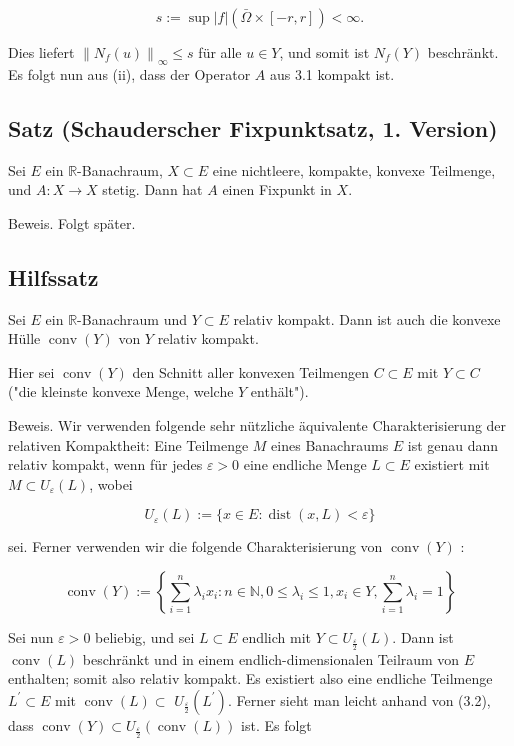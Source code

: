 \documentclass[10pt, letterpaper]{article}
\begin{document}
$$
s:=\sup |f|(\bar{\Omega} \times[-r, r])<\infty .
$$

Dies liefert $\left\|N_{f}(u)\right\|_{\infty} \leq s$ für alle $u \in Y$, und somit ist $N_{f}(Y)$ beschränkt. Es folgt nun aus (ii), dass der Operator $A$ aus 3.1 kompakt ist.

\subsection*{Satz (Schauderscher Fixpunktsatz, 1. Version)}

Sei $E$ ein $\mathbb{R}$-Banachraum, $X \subset E$ eine nichtleere, kompakte, konvexe Teilmenge, und $A: X \rightarrow X$ stetig. Dann hat $A$ einen Fixpunkt in $X$.

Beweis. Folgt später.

\subsection*{Hilfssatz}

Sei $E$ ein $\mathbb{R}$-Banachraum und $Y \subset E$ relativ kompakt. Dann ist auch die konvexe Hülle $\operatorname{conv}(Y)$ von $Y$ relativ kompakt.

Hier sei $\operatorname{conv}(Y)$ den Schnitt aller konvexen Teilmengen $C \subset E$ mit $Y \subset C$ ("die kleinste konvexe Menge, welche $Y$ enthält").

Beweis. Wir verwenden folgende sehr nützliche äquivalente Charakterisierung der relativen Kompaktheit: Eine Teilmenge $M$ eines Banachraums $E$ ist genau dann relativ kompakt, wenn für jedes $\varepsilon>0$ eine endliche Menge $L \subset E$ existiert mit $M \subset U_{\varepsilon}(L)$, wobei

$$
U_{\varepsilon}(L):=\{x \in E: \operatorname{dist}(x, L)<\varepsilon\}
$$

sei. Ferner verwenden wir die folgende Charakterisierung von $\operatorname{conv}(Y)$ :

$$
\operatorname{conv}(Y):=\left\{\sum_{i=1}^{n} \lambda_{i} x_{i}: n \in \mathbb{N}, 0 \leq \lambda_{i} \leq 1, x_{i} \in Y, \sum_{i=1}^{n} \lambda_{i}=1\right\}
$$

Sei nun $\varepsilon>0$ beliebig, und sei $L \subset E$ endlich mit $Y \subset U_{\frac{\varepsilon}{2}}(L)$. Dann ist $\operatorname{conv}(L)$ beschränkt und in einem endlich-dimensionalen Teilraum von $E$ enthalten; somit also relativ kompakt. Es existiert also eine endliche Teilmenge $L^{\prime} \subset E$ mit $\operatorname{conv}(L) \subset$ $U_{\frac{\varepsilon}{2}}\left(L^{\prime}\right)$. Ferner sieht man leicht anhand von (3.2), dass $\operatorname{conv}(Y) \subset U_{\frac{\varepsilon}{2}}(\operatorname{conv}(L))$ ist. Es folgt
\end{document}
